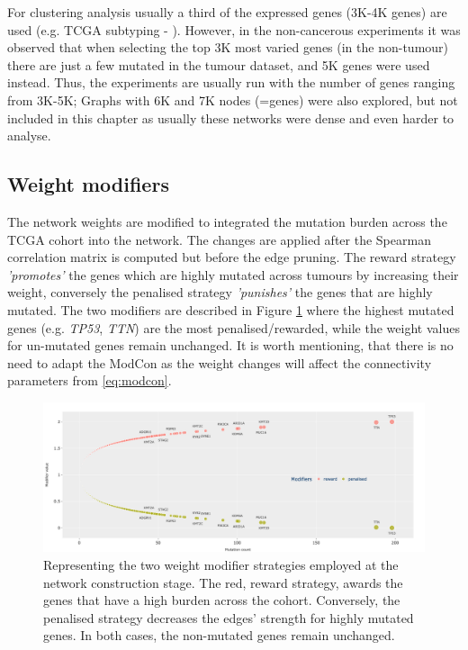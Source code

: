 For clustering analysis usually a third of the expressed genes (3K-4K genes) are used (e.g. TCGA subtyping - \citet{Robertson2017-mg}). However, in the non-cancerous experiments it was observed that when selecting the top 3K most varied genes (in the non-tumour) there are just a few mutated in the tumour dataset, and 5K genes were used instead. Thus, the experiments are usually run with the number of genes ranging from 3K-5K; Graphs with 6K and 7K nodes (=genes) were also explored, but not included in this chapter as usually these networks were dense and even harder to analyse.

\subsection{Weight modifiers}

The network weights are modified to integrated the mutation burden across the TCGA cohort into the network. The changes are applied after the Spearman correlation matrix is computed but before the edge pruning. The reward strategy \textit{'promotes'} the genes which are highly mutated across tumours by increasing their weight, conversely the penalised strategy \textit{'punishes'} the genes that are highly mutated. The two modifiers are described in Figure \ref{fig:N_I:modifiers} where the highest mutated genes (e.g. \textit{TP53}, \textit{TTN}) are the most penalised/rewarded, while the weight values for un-mutated genes remain unchanged. It is worth mentioning, that there is no need to adapt the ModCon as the weight changes will affect the connectivity parameters from  \cref{eq:modcon}.

\begin{figure}[!htb]    
    \centering
    \includegraphics[width=1.0\textwidth,keepaspectratio]{Sections/Network_I/Resources/Methods/modifiers.png}
    \caption{Representing the two weight modifier strategies employed at the network construction stage. The red, reward strategy, awards the genes that have a high burden across the cohort. Conversely, the  penalised strategy decreases the edges' strength for highly mutated genes. In both cases, the non-mutated genes remain unchanged.}
    \label{fig:N_I:modifiers}
\end{figure}

